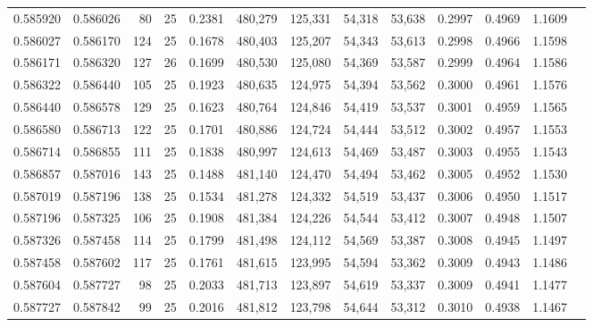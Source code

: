 \begin{tabular}{rrrrrrrrrrrrr}
0.585920 & 0.586026 &    80 &  25 &                                     0.2381 & 480,279 & 125,331 &  54,318 &  53,638 & 0.2997 & 0.4969 & 1.1609 \\
0.586027 & 0.586170 &   124 &  25 &                                     0.1678 & 480,403 & 125,207 &  54,343 &  53,613 & 0.2998 & 0.4966 & 1.1598 \\
0.586171 & 0.586320 &   127 &  26 &                                     0.1699 & 480,530 & 125,080 &  54,369 &  53,587 & 0.2999 & 0.4964 & 1.1586 \\
0.586322 & 0.586440 &   105 &  25 &                                     0.1923 & 480,635 & 124,975 &  54,394 &  53,562 & 0.3000 & 0.4961 & 1.1576 \\
0.586440 & 0.586578 &   129 &  25 &                                     0.1623 & 480,764 & 124,846 &  54,419 &  53,537 & 0.3001 & 0.4959 & 1.1565 \\
0.586580 & 0.586713 &   122 &  25 &                                     0.1701 & 480,886 & 124,724 &  54,444 &  53,512 & 0.3002 & 0.4957 & 1.1553 \\
0.586714 & 0.586855 &   111 &  25 &                                     0.1838 & 480,997 & 124,613 &  54,469 &  53,487 & 0.3003 & 0.4955 & 1.1543 \\
0.586857 & 0.587016 &   143 &  25 &                                     0.1488 & 481,140 & 124,470 &  54,494 &  53,462 & 0.3005 & 0.4952 & 1.1530 \\
0.587019 & 0.587196 &   138 &  25 &                                     0.1534 & 481,278 & 124,332 &  54,519 &  53,437 & 0.3006 & 0.4950 & 1.1517 \\
0.587196 & 0.587325 &   106 &  25 &                                     0.1908 & 481,384 & 124,226 &  54,544 &  53,412 & 0.3007 & 0.4948 & 1.1507 \\
0.587326 & 0.587458 &   114 &  25 &                                     0.1799 & 481,498 & 124,112 &  54,569 &  53,387 & 0.3008 & 0.4945 & 1.1497 \\
0.587458 & 0.587602 &   117 &  25 &                                     0.1761 & 481,615 & 123,995 &  54,594 &  53,362 & 0.3009 & 0.4943 & 1.1486 \\
0.587604 & 0.587727 &    98 &  25 &                                     0.2033 & 481,713 & 123,897 &  54,619 &  53,337 & 0.3009 & 0.4941 & 1.1477 \\
0.587727 & 0.587842 &    99 &  25 &                                     0.2016 & 481,812 & 123,798 &  54,644 &  53,312 & 0.3010 & 0.4938 & 1.1467 \\

\end{tabular}

